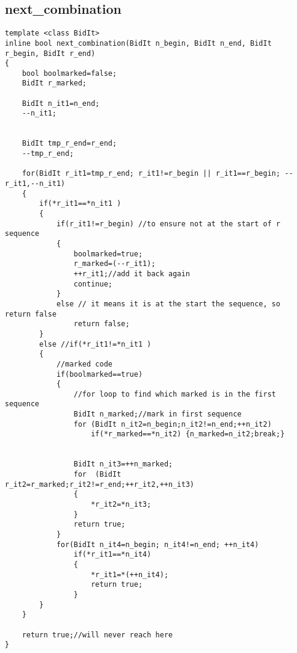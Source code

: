 \subsection{next\_combination}
\label{app:nextcombination}
\begin{verbatim}
template <class BidIt>
inline bool next_combination(BidIt n_begin, BidIt n_end, BidIt r_begin, BidIt r_end)
{
    bool boolmarked=false;
    BidIt r_marked;

    BidIt n_it1=n_end;
    --n_it1;


    BidIt tmp_r_end=r_end;
    --tmp_r_end;

    for(BidIt r_it1=tmp_r_end; r_it1!=r_begin || r_it1==r_begin; --r_it1,--n_it1)
    {
        if(*r_it1==*n_it1 )
        {
            if(r_it1!=r_begin) //to ensure not at the start of r sequence
            {
                boolmarked=true;
                r_marked=(--r_it1);
                ++r_it1;//add it back again 
                continue;
            }
            else // it means it is at the start the sequence, so return false
                return false;      
        }
        else //if(*r_it1!=*n_it1 )
        {
            //marked code
            if(boolmarked==true)
            {
                //for loop to find which marked is in the first sequence
                BidIt n_marked;//mark in first sequence
                for (BidIt n_it2=n_begin;n_it2!=n_end;++n_it2)
                    if(*r_marked==*n_it2) {n_marked=n_it2;break;}


                BidIt n_it3=++n_marked;    
                for  (BidIt r_it2=r_marked;r_it2!=r_end;++r_it2,++n_it3)
                {
                    *r_it2=*n_it3;
                }
                return true;
            }
            for(BidIt n_it4=n_begin; n_it4!=n_end; ++n_it4)
                if(*r_it1==*n_it4)
                {
                    *r_it1=*(++n_it4);
                    return true;           
                }
        }
    }  

    return true;//will never reach here    
}
\end{verbatim}
